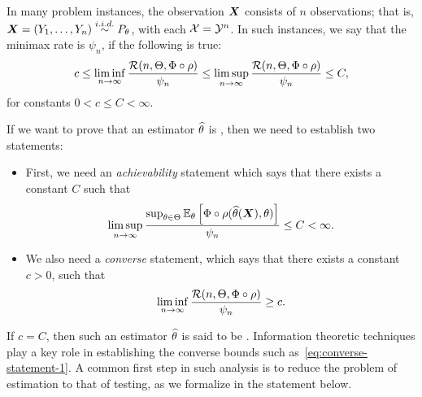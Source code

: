 \documentclass[12pt]{article}
\begin{document}
In many problem instances, the observation ${\boldsymbol X}$ consists of $n$ \iid observations; that is, ${\boldsymbol X} = (Y_1, \ldots, Y_n) \stackrel{i.i.d.}{\sim} P_\theta$, with each ${\cal X} = {\cal Y}^n$. In such instances, we say that the minimax rate is $\psi_n$, if the following is true: 
\begin{align}
c \leq \liminf_{n \to \infty} \frac{{\cal R}(n, \Theta, \Phi\circ \rho)}{\psi_n} \leq \limsup_{n \to \infty} \frac{{\cal R}(n, \Theta, \Phi\circ \rho)}{\psi_n} \leq C, 
\end{align}
for constants $0<c\leq C<\infty$. 

If we want to prove that an estimator $\widehat{\theta}$ is , then we need to establish two statements: 
\begin{itemize}
	\item First, we need an \emph{achievability} statement which says that there exists a constant $C$ such that 
	\begin{align}
		\limsup_{n \to \infty} \frac{\sup_{\theta \in \Theta} \mathbb{E}_{\theta}\left[ \Phi\circ \rho(\widehat{\theta}({\boldsymbol X}), \theta) \right]}{\psi_n} \leq C < \infty. 
	\end{align}
	\item We also need a \emph{converse} statement, which says that there exists a constant $c>0$, such that 
	\begin{align}
		\liminf_{n \to \infty} \frac{{\cal R}(n, \Theta, \Phi\circ \rho)}{\psi_n} \geq c. \label{eq:converse-statement-1}
	\end{align}
\end{itemize} 
If $c=C$, then such an estimator $\widehat{\theta}$ is said to be . Information theoretic techniques play a key role in establishing the converse bounds such as~\eqref{eq:converse-statement-1}. A common first step in such analysis is to reduce the problem of estimation to that of testing, as we formalize in the statement below. 
\end{document}
